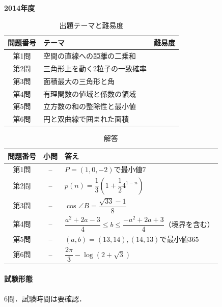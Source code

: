 \documentclass[../../main.tex]{subfiles}
\begin{document}
\begin{center}
  {\fontsize{48pt}{58pt}\selectfont \textbf{2014}\normalsize\textbf{年度}}
\end{center}

\begin{table}[htb]
  \centering
  \caption{出題テーマと難易度}
  \begin{tabular}{|c|p{9cm}|c|}
    \hline
    \textbf{問題番号} & \textbf{テーマ} & \textbf{難易度} \\
    \hline
    第1問 & 空間の直線への距離の二乗和 & \\
    \hline
    第2問 & 三角形上を動く2粒子の一致確率 & \\
    \hline
    第3問 & 面積最大の三角形と角 & \\
    \hline
    第4問 & 有理関数の値域と係数の領域 & \\
    \hline
    第5問 & 立方数の和の整除性と最小値 & \\
    \hline
    第6問 & 円と双曲線で囲まれた面積 & \\
    \hline
  \end{tabular}
\end{table}

\begin{table}[htb]
  \centering
  \caption{解答}
  \renewcommand{\arraystretch}{1.4}
  \begin{tabular}{|c|c|p{9cm}|}
    \hline
    \textbf{問題番号} & \textbf{小問} & \textbf{答え} \\
    \hline
    第1問 & -- & $P=(1,0,-2)$で最小値$7$ \\
    \hline
    第2問 & -- & $p(n)=\dfrac{1}{3}\left(1+\dfrac{1}{2}4^{1-n}\right)$ \\
    \hline
    第3問 & -- & $\cos\angle B=\dfrac{\sqrt{33}-1}{8}$ \\
    \hline
    第4問 & -- & $\dfrac{a^2+2a-3}{4}\le b\le\dfrac{-a^2+2a+3}{4}$（境界を含む） \\
    \hline
    第5問 & -- & $(a,b)=(13,14),(14,13)$で最小値$365$ \\
    \hline
    第6問 & -- & $\dfrac{2\pi}{3}-\log(2+\sqrt{3})$ \\
    \hline
  \end{tabular}
\end{table}

\paragraph{試験形態}
6問．試験時間は要確認．
\end{document}
